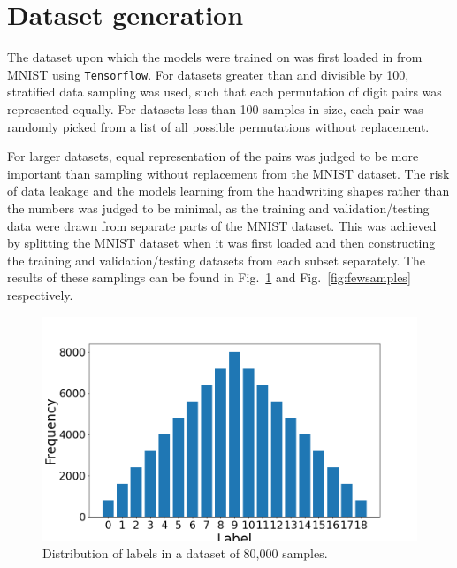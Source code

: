 \documentclass[11pt,a4paper]{article}
\begin{document}
\section{Dataset generation}
The dataset upon which the models were trained on was first loaded in from MNIST using \texttt{Tensorflow}. For datasets greater than and divisible by 100, stratified data sampling was used, such that each permutation of digit pairs was represented equally. For datasets less than 100 samples in size, each pair was randomly picked from a list of all possible permutations without replacement.

For larger datasets, equal representation of the pairs was judged to be more important than sampling without replacement from the MNIST dataset. The risk of data leakage and the models learning from the handwriting shapes rather than the numbers was judged to be minimal, as the training and validation/testing data were drawn from separate parts of the MNIST dataset. This was achieved by splitting the MNIST dataset when it was first loaded and then constructing the training and validation/testing datasets from each subset separately. The results of these samplings can be found in Fig.~\ref{fig:manysamples} and Fig.~\ref{fig:fewsamples} respectively.

\begin{figure}
    \centering
    \includegraphics[width=\columnwidth, keepaspectratio]{../Y_dist_many.png}
    \caption{Distribution of labels in a dataset of 80,000 samples.}\label{fig:manysamples}
\end{figure}
\end{document}

